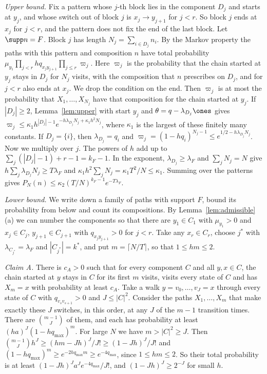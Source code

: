 \emph{Upper bound.} Fix a pattern whose $j$-th block lies in the component
$D_j$ and starts at $y_j$, and whose switch out of block $j$ is
$x_j\to y_{j+1}$ for $j<r$. So block $j$ ends at $x_j$ for $j<r$, and the
pattern does not fix the end of the last block. Let $\supp n=F$. Block $j$ has
length $N_j=\sum_{i\in D_j}n_i$. By the Markov property the paths with this
pattern and composition $n$ have total probability
$\mu_{y_1}\prod_{j<r}hq_{x_jy_{j+1}}\prod_{j\le r}\varpi_j$. Here $\varpi_j$ is the
probability that the chain started at $y_j$ stays in $D_j$ for $N_j$ visits,
with the composition that $n$ prescribes on $D_j$, and for $j<r$ also ends
at $x_j$. We drop the condition on the end. Then $\varpi_j$ is at most the probability that
$X_1,\dots,X_{N_j}$ have that composition for the chain started at $y_j$. If
$|D_j|\ge2$, Lemma~\ref{lem:upper} with start $y_j$ and
$\theta=q-\lambda_{D_j}\ones$ gives
$\varpi_j\le\kappa_1h^{|D_j|-1}e^{-h\lambda_{D_j}N_j+\kappa_1h^2N_j}$, where
$\kappa_1$ is the largest of these finitely many constants. If $D_j=\{i\}$,
then $\lambda_{D_j}=q_i$ and
$\varpi_j=(1-hq_i)^{N_j-1}\le e^{1/2-h\lambda_{D_j}N_j}$. Now we multiply over
$j$. The powers of $h$ add up to $\sum_j(|D_j|-1)+r-1=k_F-1$. In the
exponent, $\lambda_{D_j}\ge\lambda_F$ and $\sum_jN_j=N$ give
$h\sum_j\lambda_{D_j}N_j\ge T\lambda_F$ and
$\kappa_1h^2\sum_jN_j=\kappa_1T^2/N\le\kappa_1$. Summing over the patterns
gives $P_N(n)\le\kappa_2(T/N)^{k_F-1}e^{-T\lambda_F}$.

\emph{Lower bound.} We write down a family of paths with support $F$, bound
its probability from below and count its compositions. By
Lemma~\ref{lem:admissible}(a) we can number the components so that there are
$y_1\in C_1$ with $\mu_{y_1}>0$ and $x_j\in C_j$, $y_{j+1}\in C_{j+1}$ with
$q_{x_jy_{j+1}}>0$ for $j<r$. Take any $x_r\in C_r$, choose $j^*$ with
$\lambda_{C_{j^*}}=\lambda_F$ and $|C_{j^*}|=k^*$, and put
$m=\lceil N/T\rceil$, so that $1\le hm\le2$.

\emph{Claim A.} There is $c_A>0$ such that for every component $C$ and all
$y,x\in C$, the chain started at $y$ stays in $C$ for its first $m$ visits,
visits every state of $C$ and has $X_m=x$ with probability at least $c_A$.
Take a walk $y=v_0,\dots,v_J=x$ through every state of $C$ with
$q_{v_sv_{s+1}}>0$ and $J\le|C|^2$. Consider the paths $X_1,\dots,X_m$ that
make exactly these $J$ switches, in this order, at any $J$ of the $m-1$
transition times. There are $\binom{m-1}J$ of them, and each has probability
at least $(ha)^J(1-hq_{\max})^m$. For large $N$ we have $m>|C|^2\ge J$. Then
$\binom{m-1}Jh^J\ge(hm-Jh)^J/J!\ge(1-Jh)^J/J!$ and
$(1-hq_{\max})^m\ge e^{-2hq_{\max}m}\ge e^{-4q_{\max}}$, since
$1\le hm\le2$. So their total probability is at least
$(1-Jh)^Ja^Je^{-4q_{\max}}/J!$, and $(1-Jh)^J\ge2^{-J}$ for small $h$.

